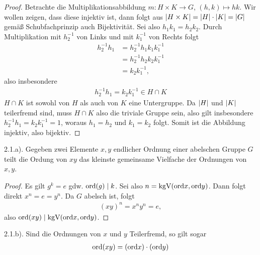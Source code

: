 \documentclass{article}
\newcommand{\ex}[1]{\tit{Übung} #1.}
\begin{document}
		\begin{proof}
			Betrachte die Multiplikationsabbildung $m : H \times K \to G$, $(h,k) \mapsto hk$. Wir wollen zeigen, dass diese injektiv ist, dann folgt aus $\abs{H \times K} = \abs{H} \cdot \abs{K} = \abs{G}$ gemäß Schubfachprinzip auch Bijektivität.
			\newpar
			Sei also $h_1k_1 = h_2k_2$. Durch Multiplikation mit $h_2^{-1}$ von Links und mit $k_1^{-1}$ von Rechts folgt
			\begin{align*}
				h_2^{-1}h_1 
				&= h_2^{-1} h_1 k_1 k_1^{-1}\\
				&= h_2^{-1} h_2 k_2 k_1^{-1}\\
				&= k_2k_1^{-1},
			\end{align*}
			also insbesondere
			\begin{align*}
				h_2^{-1}h_1 = k_2k_1^{-1} \in H \cap K
			\end{align*}
			$H \cap K$ ist sowohl von $H$ als auch von $K$ eine Untergruppe. Da $\abs{H}$ und $\abs{K}$ teilerfremd sind, muss $H \cap K$ also die triviale Gruppe sein, also gilt insbesondere $h_2^{-1}h_1 = k_2k_1^{-1} = 1$, woraus $h_1 = h_2$ und $k_1 = k_2$ folgt. Somit ist die Abbildung injektiv, also bijektiv.
		\end{proof}
		\newpar
		\ex{2.1.a)} Gegeben zwei Elemente $x,y$ endlicher Ordnung einer abelschen Gruppe $G$ teilt die Ordung von $xy$ das kleinste gemeinsame Vielfache der Ordnungen von $x,y$.
		\begin{proof}
			Es gilt $g^k = e$ gdw. $\textnormal{ord}(g) \mid k$. Sei also $n = \textnormal{kgV}(\textnormal{ord} x, \textnormal{ord} y)$. Dann folgt direkt $x^n = e = y^n$. Da $G$ abelsch ist, folgt
			\begin{align*}
				(xy)^n = x^ny^n = e,
			\end{align*}
			also $\textnormal{ord}(xy) \mid \textnormal{kgV}(\textnormal{ord} x, \textnormal{ord} y)$.
		\end{proof}
		\newpar
		\ex{2.1.b)} Sind die Ordnungen von $x$ und $y$ Teilerfremd, so gilt sogar
		\begin{align*}
			\textnormal{ord}(xy) = (\textnormal{ord} x) \cdot (\textnormal{ord} y)
		\end{align*}
\end{document}
